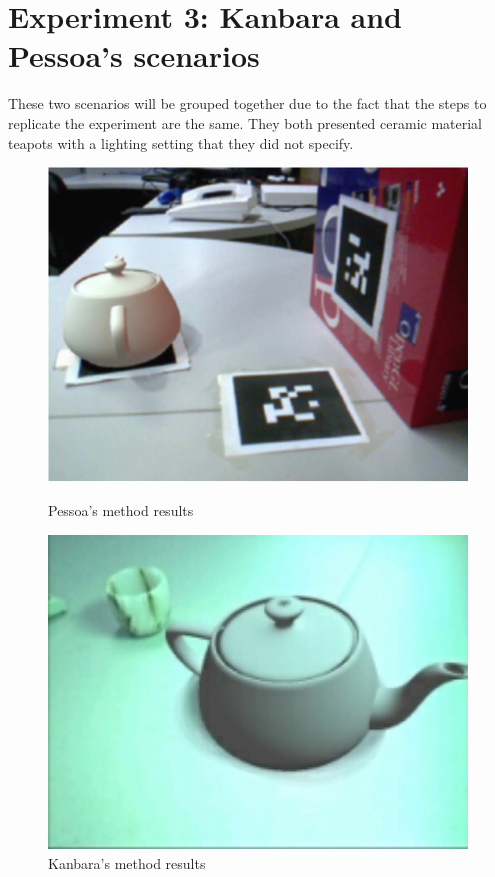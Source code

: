 \section{Experiment 3: Kanbara and Pessoa's scenarios} 
These two scenarios will be grouped together due to the fact that the steps to replicate the experiment are the same. They both presented ceramic material teapots with a lighting setting that they did not specify. 
\begin{figure}[H]
    \centering
    \begin{minipage}{0.475\textwidth}
        \centering
        \includegraphics[width=0.99\textwidth]{Figures/Pessoa.png} %
        \caption{Pessoa's method results}
    \end{minipage}\hfill
    \begin{minipage}{0.475\textwidth}
        \centering
        \includegraphics[width=0.99\textwidth]{Figures/kanbara.png} %
        \caption{Kanbara's method results}
    \end{minipage}\hfill
\end{figure}

